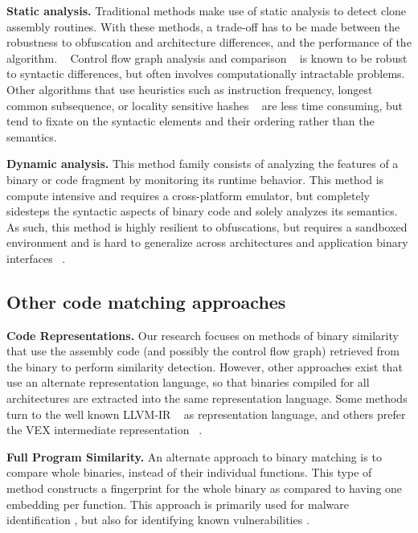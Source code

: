 \textbf{Static analysis.} Traditional methods make use of static analysis to detect clone assembly routines. With these methods, a trade-off has
to be made between the robustness to obfuscation and architecture differences, and the performance of the algorithm. ~\cite{BCSDsurvey}
Control flow graph analysis and comparison ~\cite{BinDiff,graph-bug-search} is known to be robust to syntactic differences, but often
involves computationally intractable problems. Other algorithms that use heuristics such as instruction frequency,
longest common subsequence, or locality sensitive hashes ~\cite{clones.net,op-seq,sem-hash} are less time consuming, but tend to fixate on the syntactic
elements and their ordering rather than the semantics.

\noindent \textbf{Dynamic analysis.} This method family consists of analyzing the features of a binary or code fragment by monitoring its runtime behavior.
This method is compute intensive and requires a cross-platform emulator, but completely sidesteps the syntactic aspects of binary code
and solely analyzes its semantics. ~\cite{BCSD} As such, this method is highly resilient to obfuscations, but requires a sandboxed environment
and is hard to generalize across architectures and application binary interfaces ~\cite{blanket-exec}.

\subsection{Other code matching approaches}

\noindent \textbf{Code Representations.} Our research focuses on methods of binary similarity that use the assembly
code (and possibly the control flow graph) retrieved from the binary to perform similarity detection. However, other
approaches exist that use an alternate representation language, so that binaries compiled for all architectures are
extracted into the same representation language. Some methods turn to the well known LLVM-IR ~\cite{llvmir1, llvmir2, llvmir3}
as representation language, and others prefer the VEX intermediate representation ~\cite{VexIR2Vec, Zeek}.

\noindent \textbf{Full Program Similarity.} An alternate approach to binary matching is to compare whole binaries, instead
of their individual functions. This type of method constructs a fingerprint for the whole binary as compared to having one embedding
per function. This approach is primarily used for malware identification \cite{malware-id, malware-id2, malware-id3, malware-id4},
but also for identifying known vulnerabilities \cite{precise-static-vuln, firmware-vuln}.

